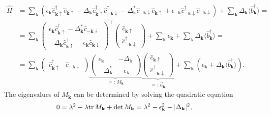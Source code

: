 \documentclass[english, parskip=full]{scrartcl}
\newcommand{\kla}{}
\newcommand{\tecxt}{}
\begin{document}
\begin{align}
\hat{H} &= \sum_{\mathbf{k}} \kla\left( \epsilon_{\mathbf{k}} \hat{c}_{\mathbf{k}\uparrow}^\dagger \hat{c}_{\mathbf{k}\uparrow} - \Delta_{\mathbf{k}} \hat{c}_{\mathbf{k}\uparrow}^\dagger \hat{c}_{-\mathbf{k}\downarrow}^\dagger - \Delta_{\mathbf{k}}^\ast \hat{c}_{-\mathbf{k}\downarrow} \hat{c}_{\mathbf{k}\uparrow} + \epsilon_{-\mathbf{k}} \hat{c}_{-\mathbf{k}\downarrow}^\dagger \hat{c}_{-\mathbf{k}\downarrow}  \right)  + \sum_{\textbf{k}} \Delta_\textbf{k} \langle \hat{b}_{\mathbf{k}}^\dagger \rangle = \\
&= \sum_{\mathbf{k}} \begin{pmatrix}
\epsilon_{\mathbf{k}} \hat{c}_{\mathbf{k}\uparrow}^\dagger - \Delta_{\mathbf{k}}^\ast \hat{c}_{-\mathbf{k}\downarrow} \\ -\Delta_{\mathbf{k}}\hat{c}_{\mathbf{k}\uparrow}^\dagger - \epsilon_{\mathbf{k}} \hat{c}_{\mathbf{k}\downarrow}
\end{pmatrix}^\top \begin{pmatrix}
\hat{c}_{\mathbf{k}\uparrow} \\ \hat{c}_{-\mathbf{k}\downarrow}^\dagger
\end{pmatrix} + \sum_{\mathbf{k}}\epsilon_{\mathbf{k}} + \sum_{\textbf{k}} \Delta_\textbf{k} \langle \hat{b}_{\mathbf{k}}^\dagger \rangle = \\
&= \sum_{\mathbf{k}} \begin{pmatrix}
\hat{c}_{\mathbf{k}\uparrow}^\dagger & \hat{c}_{-\mathbf{k}\downarrow}
\end{pmatrix} \underbrace{\begin{pmatrix}
\epsilon_{\mathbf{k}} & -\Delta_{\mathbf{k}} \\ -\Delta_{\mathbf{k}}^\ast & -\epsilon_{\mathbf{k}}
\end{pmatrix}}_{=:\,M_{\mathbf{k}}} \underbrace{\begin{pmatrix}
\hat{c}_{\mathbf{k}\uparrow} \\ \hat{c}_{-\mathbf{k}\downarrow}^\dagger
\end{pmatrix}}_{=:\,\vec{u}_{\mathbf{k}}}  + \sum_{\textbf{k}}\kla\left(  \epsilon_\textbf{k} + \Delta_\textbf{k} \langle \hat{b}_{\mathbf{k}}^\dagger \rangle \right).
\end{align}
The eigenvalues of $M_{\mathbf{k}}$ can be determined by solving the quadratic equation
\begin{align}
0 &= \lambda^2 - \lambda \tecxt\text{tr\,}M_{\mathbf{k}} + \det M_{\mathbf{k}} = \lambda^2 - \epsilon_{\mathbf{k}}^2 - |\Delta_{\mathbf{k}}|^2,
\end{align}
\end{document}

